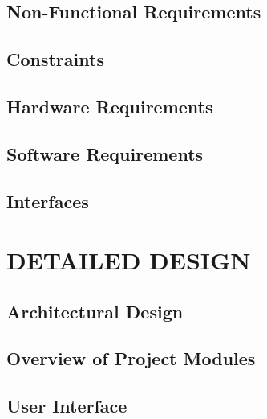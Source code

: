 \documentclass[12pt,a4]{report}
\newcounter{lofmodule}
\newcounter{lofsubmodule}[lofmodule]
\newcounter{lofsubsubmodule}[lofsubmodule]
\renewcommand{\thelofmodule}{\arabic{lofmodule}}
\newcommand{\lofsection}[1]{%
  \refstepcounter{lofmodule}%
  \setcounter{lofsubmodule}{0}%
  \setcounter{lofsubsubmodule}{0}%
  \addtocontents{lof}{\protect\vspace{1em}}%
  \addtocontents{lof}{\protect\noindent \textbf{\thelofmodule.\hspace{1em} #1}\protect\par}%
  \addtocontents{lof}{\protect\vspace{0.5em}}%
}
\begin{document}
\section{Non-Functional Requirements}

\section{Constraints}

\section{Hardware Requirements}

\section{Software Requirements}

\section{Interfaces}

\chapter{DETAILED DESIGN}

\section{Architectural Design}

\vspace{0.3cm} 



\section{Overview of Project Modules}

\section{User Interface}
\end{document}
